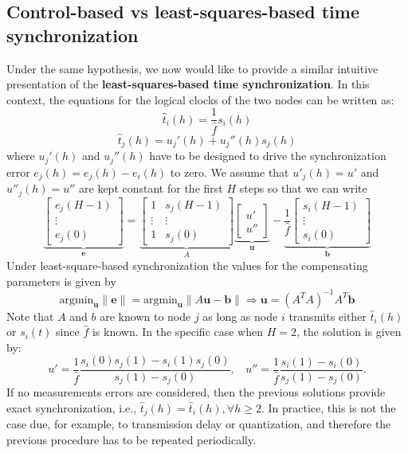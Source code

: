 \documentclass[english,a4paper,10pt,final]{article}
\numberwithin{equation}{section}
\numberwithin{figure}{section}
\begin{document}
\subsection{Control-based vs least-squares-based time synchronization}
\label{subsec:control_vs_least_squares}


Under the same hypothesis, we now would like to provide a similar intuitive presentation of the \textbf{least-squares-based time synchronization}.  In this context, the equations for the logical clocks of the two nodes can be written as:
$$ \hat{t}_i(h) =\frac{1}{\hat f}s_i(h) $$
$$ \hat{t}_j(h) = u_j'(h)+u_j''(h)s_j(h) $$
where $u_j'(h)$ and $u_j''(h)$  have to be designed to drive the synchronization error $e_j(h)=e_j(h)-e_i(h)$ to zero. We assume that $u'_j(h)=u'$ and $u''_j(h)=u''$ are kept constant for the first $H$ steps so that we can write
$$ \underbrace{\left[\begin{array}{c} e_j(H-1) \\ \vdots \\ e_j(0)  \end{array}\right]}_{\mathbf{e}}=\underbrace{\left[\begin{array}{cc} 1 & s_j(H-1) \\ \vdots & \vdots \\ 1 & s_j(0)  \end{array}\right]}_{A} \underbrace{\left[\begin{array}{c} u' \\ u''  \end{array}\right]}_{\mathbf{u}}- \underbrace{\frac{1}{\hat f }\left[\begin{array}{c} s_i(H-1) \\ \vdots \\ s_i(0)  \end{array}\right]}_{\mathbf{b}}$$
Under least-square-based synchronization the values for the compensating parameters is given by
$$ \mathrm{argmin}_{\mathbf{u}} \|\mathbf{e}\| = \mathrm{argmin}_{\mathbf{u}}  \| A\mathbf{u}-\mathbf{b}\|\Longrightarrow \mathbf{u}=(A^TA)^{-1}A^T\mathbf{b}$$
Note that $A$ and $b$ are known to node $j$ as long as node $i$ transmits either $\hat t_i(h)$ or $s_i(t)$ since $\hat f $ is known. In the specific case when $H=2$, the solution is given by:
\begin{equation} \label{eqn:LS}
u'= \frac{1}{\hat f }\frac{s_i(0)s_j(1)-s_i(1)s_j(0)}{s_j(1)-s_j(0)}, \ \ \ \ u'' = \frac{1}{\hat f }\frac{s_i(1)-s_i(0)}{s_j(1)-s_j(0)}.
\end{equation}
If no measurements errors are considered, then the previous solutions provide exact synchronization, i.e., $\hat t_j(h)=\hat t_i (h), \forall h\geq 2$. In practice, this is not the case due, for example, to transmission delay or quantization, and therefore the previous procedure has to be repeated periodically. 
\end{document}
